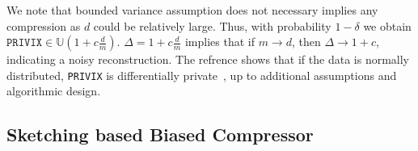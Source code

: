 \documentclass[11pt]{article}
\begin{document}
 We note that bounded variance assumption does not necessary implies any compression as $d$ could be relatively large. 
Thus, with probability $1-\delta$ we obtain  $\texttt{PRIVIX}\in \mathbb{U}(1+c\frac{d}{m})$.
 $\Delta=1+c\frac{d}{m}$ implies that if $m\rightarrow d$, then $\Delta\rightarrow 1+c$, indicating a noisy reconstruction. The refrence
 \cite{li2019privacy} shows that if the data is normally distributed, \texttt{PRIVIX} is differentially private~\citep{DBLP:conf/icalp/Dwork06}, up to additional assumptions and algorithmic design.  


\vspace{-0.05in}
\subsection{Sketching based Biased Compressor}
\vspace{-0.05in}
\end{document}
